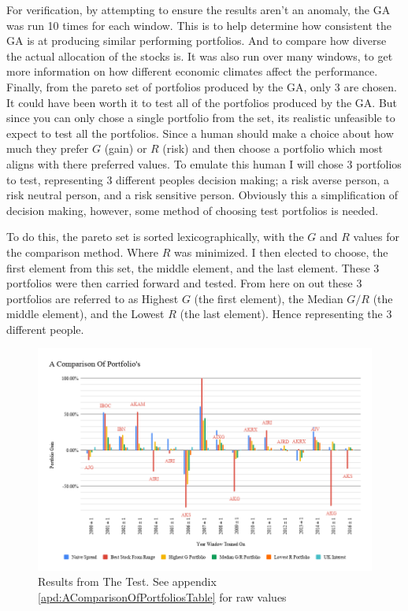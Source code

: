 \documentclass[11pt]{article}
\begin{document}
    For verification, by attempting to ensure the results aren't an anomaly, the GA was run 10
    times for each window. This is to help determine how consistent the GA is at producing
    similar performing portfolios. And to compare how diverse the actual allocation
    of the stocks is. It was also run over many windows, to get more information
    on how different economic climates affect the performance. Finally, from the pareto
    set of portfolios produced by the GA, only 3 are chosen. It could have been worth
    it to test all of the portfolios produced by the GA. But since you can only
    chose a single portfolio from the set, its realistic unfeasible to expect to
    test all the portfolios. Since a human should make a choice about how much
    they prefer \(G\) (gain) or \(R\) (risk) and then choose a portfolio which most
    aligns with there preferred values. To emulate this human I will chose 3
    portfolios to test, representing 3 different peoples decision making; a risk
    averse person, a risk neutral person, and a risk sensitive person. Obviously
    this a simplification of decision making, however, some method of choosing
    test portfolios is needed.

    To do this, the pareto set is sorted lexicographically, with the \(G\) and \(R\)
    values for the comparison method. Where \(R\) was minimized. I then elected to choose,
    the first element from this set, the middle element, and the last element.
    These 3 portfolios were then carried forward and tested. From here on out
    these 3 portfolios are referred to as Highest \(G\) (the first element),
    the Median \(G/R\) (the middle element), and the Lowest \(R\) (the last element).
    Hence representing the 3 different people.

    \begin{figure}[H] %
        \includegraphics[width=\textwidth]{AComparisonOfPortfolios}
        \caption{Results from The Test. See appendix \ref{apd:AComparisonOfPortfoliosTable} for raw values}
            \label{fig:AComparisonOfPortfolios}
    \end{figure}
\end{document}
